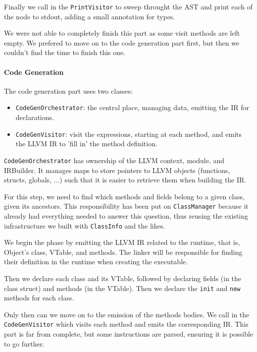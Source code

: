 \documentclass{article}
\begin{document}
Finally we call in the \texttt{PrintVisitor} to sweep throught the AST and print each of the node to stdout, adding a small annotation for types.

We were not able to completely finish this part as some visit methods are left empty. We prefered to move on to the code generation part first, but then we couldn't find the time to finish this one.

\paragraph{Code Generation}

The code generation part uses two classes:

\begin{itemize}
    \item \texttt{CodeGenOrchestrator}: the central place, managing data, emitting the IR for declarations. 
    \item \texttt{CodeGenVisitor}: visit the expressions, starting at each method, and emits the LLVM IR to 'fill in' the method definition.
\end{itemize}

\texttt{CodeGenOrchestrator} has ownership of the LLVM context, module, and IRBuilder. It manages maps to store pointers to LLVM objects (functions, structs, globals, ...) such that it is easier to retrieve them when building the IR.

For this step, we need to find which methods and fields belong to a given class, given its ancestors. This responsibility has been put on \texttt{ClassManager} because it already had everything needed to answer this question, thus reusing the existing infrastructure we built with \texttt{ClassInfo} and the likes. 

We begin the phase by emitting the LLVM IR related to the runtime, that is, Object's class, VTable, and methods. The linker will be responsible for finding their definition in the runtime when creating the executable.

Then we declare each class and its VTable, followed by declaring fields (in the class struct) and methods (in the VTable). Then we declare the \texttt{init} and \texttt{new} methods for each class.

Only then can we move on to the emission of the methods bodies. We call in the \texttt{CodeGenVisitor} which visits each method and emits the corresponding IR. This part is far from complete, but some instructions are parsed, ensuring it is possible to go further.
\end{document}
